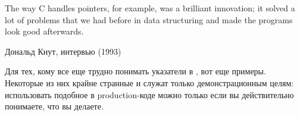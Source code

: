 \myindex{\CLanguageElements!\Pointers}
\label{label_pointers}

\epigraph{The way C handles pointers, for example, was a brilliant innovation;
it solved a lot of problems that we had before in data structuring and
made the programs look good afterwards.}{Дональд Кнут, интервью (1993)}

Для тех, кому все еще трудно понимать указатели в \CCpp{}, вот еще примеры.
Некоторые из них крайне странные и служат только демонстрационным целям:
использовать подобное в production-коде можно только если вы действительно понимаете, что вы делаете.










